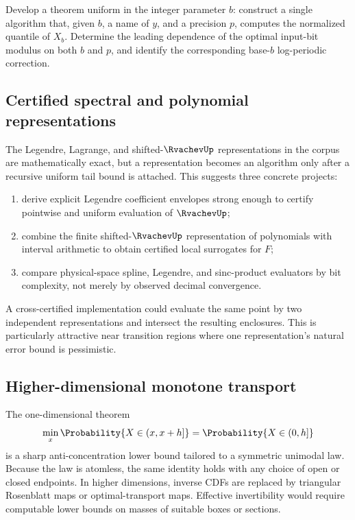 \begin{problem}
\label{comp:prob:uniform-base}
Develop a theorem uniform in the integer parameter $b$: construct a single
algorithm that, given $b$, a name of $y$, and a precision $p$, computes the
normalized quantile of $X_b$.  Determine the leading dependence of the
optimal input-bit modulus on both $b$ and $p$, and identify the corresponding
base-$b$ log-periodic correction.
\end{problem}

\subsection{Certified spectral and polynomial representations}

The Legendre, Lagrange, and shifted-$\RvachevUp$ representations in the corpus are
mathematically exact, but a representation becomes an algorithm only after a
recursive uniform tail bound is attached.  This suggests three concrete
projects:

\begin{enumerate}
\item derive explicit Legendre coefficient envelopes strong enough to certify
      pointwise and uniform evaluation of $\RvachevUp$;
\item combine the finite shifted-$\RvachevUp$ representation of polynomials with
      interval arithmetic to obtain certified local surrogates for $F$;
\item compare physical-space spline, Legendre, and sinc-product evaluators by
      bit complexity, not merely by observed decimal convergence.
\end{enumerate}

A cross-certified implementation could evaluate the same point by two
independent representations and intersect the resulting enclosures.  This is
particularly attractive near transition regions where one representation's
natural error bound is pessimistic.

\subsection{Higher-dimensional monotone transport}

The one-dimensional theorem
\[
 \min_x \Probability\{X\in(x,x+h]\}=\Probability\{X\in(0,h]\}
\]
is a sharp anti-concentration lower bound tailored to a symmetric unimodal
law.  Because the law is atomless, the same identity holds with any choice of
open or closed endpoints.  In higher dimensions, inverse CDFs are replaced by
triangular Rosenblatt maps or optimal-transport maps.  Effective invertibility
would require computable lower bounds on masses of suitable boxes or sections.

